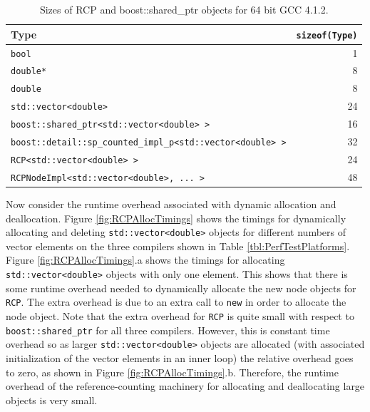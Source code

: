 \documentclass[pdf,ps2pdf,11pt]{SANDreport}
\begin{document}
\begin{table}
\begin{center}
\begin{tabular}{|l|r|}
\hline
Type
& {}\texttt{sizeof(Type)} \\
\hline
{}\texttt{bool}
& 1 \\
\hline
{}\texttt{double*}
& 8 \\
\hline
{}\texttt{double}
& 8 \\
\hline
{}\texttt{std::vector<double>}
& 24 \\
\hline
{}\texttt{boost::shared\_ptr<std::vector<double> >}
& 16 \\
\hline
{}\texttt{boost::detail::sp\_counted\_impl\_p<std::vector<double> >}
& 32 \\
\hline
{}\texttt{RCP<std::vector<double> >}
& 24 \\
\hline
{}\texttt{RCPNodeImpl<std::vector<double>, ... >}
& 48 \\
\hline
\end{tabular}
\end{center}
\caption{\label{tbl:RCP-SP-sizes}
Sizes of RCP and boost::shared\_ptr objects for 64 bit GCC 4.1.2.}
\end{table}


Now consider the runtime overhead associated with dynamic allocation
and deallocation.  Figure {}\ref{fig:RCPAllocTimings} shows the
timings for dynamically allocating and deleting
{}\texttt{std::vector<double>} objects for different numbers of vector
elements on the three compilers shown in Table
{}\ref{tbl:PerfTestPlatforms}.  Figure {}\ref{fig:RCPAllocTimings}.a
shows the timings for allocating {}\texttt{std::vector<double>}
objects with only one element.  This shows that there is some runtime
overhead needed to dynamically allocate the new node objects for
{}\texttt{RCP}.  The extra overhead is due to an extra call to
{}\texttt{new} in order to allocate the node object.  Note that the
extra overhead for {}\texttt{RCP} is quite small with respect to
{}\texttt{boost::shared\_ptr} for all three compilers.  However, this
is constant time overhead so as larger {}\texttt{std::vector<double>}
objects are allocated (with associated initialization of the vector
elements in an inner loop) the relative overhead goes to zero, as
shown in Figure {}\ref{fig:RCPAllocTimings}.b.  Therefore, the runtime
overhead of the reference-counting machinery for allocating and
deallocating large objects is very small.
\end{document}
